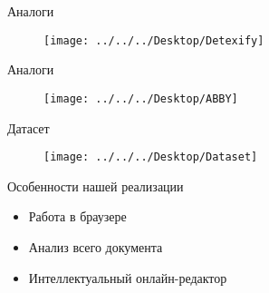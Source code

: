 \documentclass{beamer}
\begin{document}
\begin{frame}{Аналоги}
    \begin{figure}
        \centering
        \texttt{[image: ../../../Desktop/Detexify]}
        \label{fig:math}
    \end{figure}
\end{frame}
\begin{frame}{Аналоги}
    \begin{figure}
        \centering
        \texttt{[image: ../../../Desktop/ABBY]}
        \label{fig:math}
    \end{figure}
\end{frame}
\begin{frame}{Датасет}
    \begin{figure}
        \centering
        \texttt{[image: ../../../Desktop/Dataset]}
        \label{fig:math}
    \end{figure}
\end{frame}
\begin{frame}{Особенности нашей реализации}
    \begin{itemize}
        \item Работа в браузере
        \item Анализ всего документа
        \item Интеллектуальный онлайн-редактор
    \end{itemize}
\end{frame}
\end{document}
